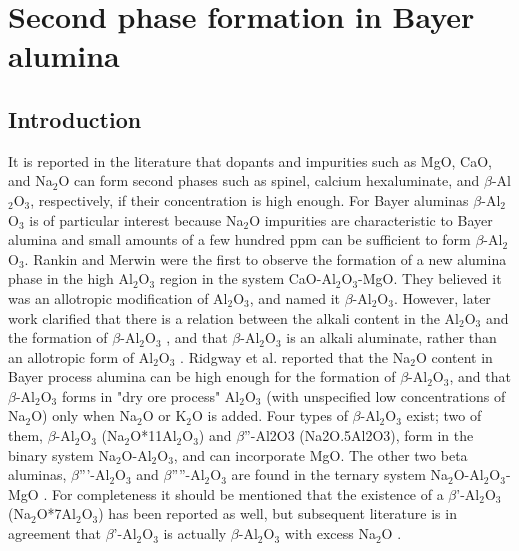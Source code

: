 \chapter{Second phase formation in Bayer alumina}

\section{Introduction}
It is reported in the literature that dopants and impurities such as MgO, CaO, and Na$_{2}$O can form second phases such as spinel, calcium hexaluminate, and $\beta$-Al$_{2}$O$_{3}$, respectively, if their concentration is high enough. For Bayer aluminas $\beta$-Al$_{2}$O$_{3}$ is of particular interest because Na$_{2}$O impurities are characteristic to Bayer alumina and small amounts of a few hundred ppm can be sufficient to form $\beta$-Al$_{2}$O$_{3}$. Rankin and Merwin \cite{Rankin1916} were the first to observe the formation of a new alumina phase in the high Al$_{2}$O$_{3}$ region in the system CaO-Al$_{2}$O$_{3}$-MgO. They believed it was an allotropic modification of Al$_{2}$O$_{3}$, and named it $\beta$-Al$_{2}$O$_{3}$. However, later work clarified that there is a relation between the alkali content in the Al$_{2}$O$_{3}$ and the formation of $\beta$-Al$_{2}$O$_{3}$ \cite{Stillwell1926}, and that $\beta$-Al$_{2}$O$_{3}$ is an alkali aluminate, rather than an allotropic form of Al$_{2}$O$_{3}$ \cite{Vries1969}. Ridgway et al. \cite{Ridgway1936} reported that the Na$_{2}$O content in Bayer process alumina can be high enough for the formation of $\beta$-Al$_{2}$O$_{3}$, and that $\beta$-Al$_{2}$O$_{3}$ forms in "dry ore process" Al$_{2}$O$_{3}$ (with unspecified low concentrations of Na$_{2}$O) only when Na$_{2}$O or K$_{2}$O is added. Four types of $\beta$-Al$_{2}$O$_{3}$ exist; two of them, $\beta$-Al$_{2}$O$_{3}$ (Na$_{2}$O*11Al$_{2}$O$_{3}$) and $\beta$''-Al2O3 (Na2O.5Al2O3), form in the binary system Na$_{2}$O-Al$_{2}$O$_{3}$, and can incorporate MgO. The other two beta aluminas, $\beta$'''-Al$_{2}$O$_{3}$ and $\beta$''''-Al$_{2}$O$_{3}$ are found in the ternary system Na$_{2}$O-Al$_{2}$O$_{3}$-MgO \cite{Stevens1984}. For completeness it should be mentioned that the existence of a $\beta$'-Al$_{2}$O$_{3}$ (Na$_{2}$O*7Al$_{2}$O$_{3}$) has been reported as well, but subsequent literature is in agreement that $\beta$'-Al$_{2}$O$_{3}$ is actually $\beta$-Al$_{2}$O$_{3}$ with excess Na$_{2}$O \cite{Stevens1984}.

